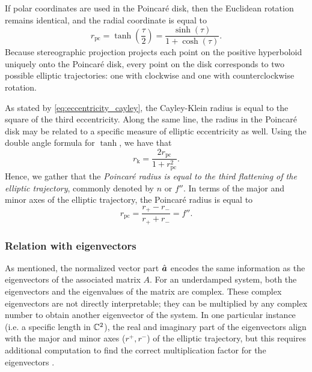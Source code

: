 If polar coordinates are used in the Poincaré disk, then the Euclidean rotation remains identical, and the radial coordinate is equal to
\begin{equation} 
    r_\text{pc} = \tanh(\frac{\tau}{2}) = \frac{\sinh(\tau)}{1 + \cosh(\tau)}. 
\end{equation}
Because stereographic projection projects each point on the positive hyperboloid uniquely onto the Poincaré disk, every point on the disk corresponds to two possible elliptic trajectories: one with clockwise and one with counterclockwise rotation.

As stated by \cref{eq:eccentricity_cayley}, the Cayley-Klein radius is equal to the square of the third eccentricity. Along the same line, the radius in the Poincaré disk may be related to a specific measure of elliptic eccentricity as well. Using the double angle formula for \( \tanh \), we have that
\begin{equation}
     r_\text{k} = \frac{2r_\text{pc}}{1 + r_\text{pc}^2}.
\end{equation}
Hence, we gather that the \emph{Poincaré radius is equal to the third flattening of the elliptic trajectory}, commonly denoted by \(n\) or \(f''\). In terms of the major and minor axes of the elliptic trajectory, the Poincaré radius is equal to
\begin{equation}
     r_\text{pc} = \frac{r_+ - r_-}{r_+ + r_-} = f''.
\end{equation}

\subsubsection{Relation with eigenvectors} 
As mentioned, the normalized vector part \(\uvec{a}\) encodes the same information as the eigenvectors of the associated matrix \(A\). For an underdamped system, both the eigenvectors and the eigenvalues of the matrix are complex. These complex eigenvectors are not directly interpretable; they can be multiplied by any complex number to obtain another eigenvector of the system. In one particular instance (i.e. a specific length in \(\mathbb{C}^2\)), the real and imaginary part of the eigenvectors align with the major and minor axes (\(r^+, r^-\)) of the elliptic trajectory, but this requires additional computation to find the correct multiplication factor for the eigenvectors \cite{Edwards2018}. 


